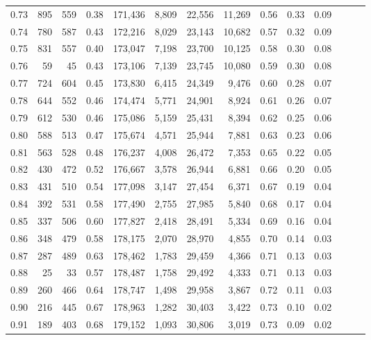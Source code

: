 \begin{tabular}{rrrrrrrrrrrrrr}
0.73 &    895 &  559 &  0.38 &  171,436 &    8,809 &  22,556 &  11,269 &  0.56 &  0.33 &      0.09 \\
0.74 &    780 &  587 &  0.43 &  172,216 &    8,029 &  23,143 &  10,682 &  0.57 &  0.32 &      0.09 \\
0.75 &    831 &  557 &  0.40 &  173,047 &    7,198 &  23,700 &  10,125 &  0.58 &  0.30 &      0.08 \\
0.76 &     59 &   45 &  0.43 &  173,106 &    7,139 &  23,745 &  10,080 &  0.59 &  0.30 &      0.08 \\
0.77 &    724 &  604 &  0.45 &  173,830 &    6,415 &  24,349 &   9,476 &  0.60 &  0.28 &      0.07 \\
0.78 &    644 &  552 &  0.46 &  174,474 &    5,771 &  24,901 &   8,924 &  0.61 &  0.26 &      0.07 \\
0.79 &    612 &  530 &  0.46 &  175,086 &    5,159 &  25,431 &   8,394 &  0.62 &  0.25 &      0.06 \\
0.80 &    588 &  513 &  0.47 &  175,674 &    4,571 &  25,944 &   7,881 &  0.63 &  0.23 &      0.06 \\
0.81 &    563 &  528 &  0.48 &  176,237 &    4,008 &  26,472 &   7,353 &  0.65 &  0.22 &      0.05 \\
0.82 &    430 &  472 &  0.52 &  176,667 &    3,578 &  26,944 &   6,881 &  0.66 &  0.20 &      0.05 \\
0.83 &    431 &  510 &  0.54 &  177,098 &    3,147 &  27,454 &   6,371 &  0.67 &  0.19 &      0.04 \\
0.84 &    392 &  531 &  0.58 &  177,490 &    2,755 &  27,985 &   5,840 &  0.68 &  0.17 &      0.04 \\
0.85 &    337 &  506 &  0.60 &  177,827 &    2,418 &  28,491 &   5,334 &  0.69 &  0.16 &      0.04 \\
0.86 &    348 &  479 &  0.58 &  178,175 &    2,070 &  28,970 &   4,855 &  0.70 &  0.14 &      0.03 \\
0.87 &    287 &  489 &  0.63 &  178,462 &    1,783 &  29,459 &   4,366 &  0.71 &  0.13 &      0.03 \\
0.88 &     25 &   33 &  0.57 &  178,487 &    1,758 &  29,492 &   4,333 &  0.71 &  0.13 &      0.03 \\
0.89 &    260 &  466 &  0.64 &  178,747 &    1,498 &  29,958 &   3,867 &  0.72 &  0.11 &      0.03 \\
0.90 &    216 &  445 &  0.67 &  178,963 &    1,282 &  30,403 &   3,422 &  0.73 &  0.10 &      0.02 \\
0.91 &    189 &  403 &  0.68 &  179,152 &    1,093 &  30,806 &   3,019 &  0.73 &  0.09 &      0.02 \\

\end{tabular}
